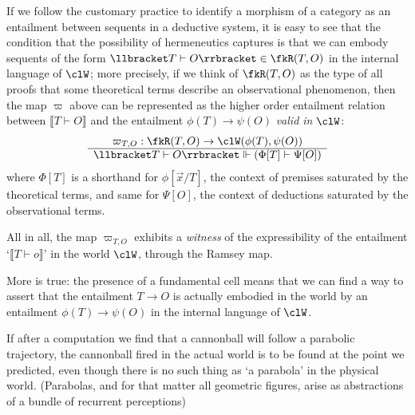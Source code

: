 \begin{remark}\label{herme_explained}
If we follow the customary practice to identify a morphism of a category as an entailment between sequents in a deductive system, it is easy to see that the condition that the possibility of hermeneutics captures is that we can embody sequents of the form $\llbracket T\vdash O\rrbracket \in \fkR(T,O)$ in the internal language of $\clW$; more precisely, if we think of $\fkR(T,O)$ as the type of all proofs that some theoretical terms describe an observational phenomenon, then the map $\varpi$ above can be represented as the higher order entailment relation between $\llbracket T\vdash O\rrbracket$ and the entailment $\phi(T) \to \psi(O)$ \emph{valid in $\clW$}:
\[ \begin{array}{c}
	\varpi_{T,O} : \fkR(T,O) \to \clW(\phi(T),\psi(O)) \\ \hline 
	\llbracket T\vdash O\rrbracket \Vdash (\Phi[T] \vdash \Psi[O])
\end{array} \] 
where $\Phi[T]$ is a shorthand for $\phi[\vec x/T]$, the context of premises saturated by the theoretical terms, and same for $\Psi[O]$, the context of deductions saturated by the observational terms. 
\end{remark}
All in all, the map $\varpi_{T,O}$ exhibits a \emph{witness} of the expressibility of the entailment `$\llbracket T\vdash o\rrbracket$' in the world $\clW$, through the Ramsey map.

More is true: the presence of a fundamental cell means that we can find a way to assert that the entailment $T\to O$ is actually embodied in the world by an entailment $\phi(T)\to \psi(O)$ in the internal language of $\clW$.

If after a computation we find that a cannonball will follow a parabolic trajectory, the cannonball fired in the actual world is to be found at the point we predicted, even though there is no such thing as `a parabola' in the physical world. (Parabolas, and for that matter all geometric figures, arise as abstractions of a bundle of recurrent perceptions)

